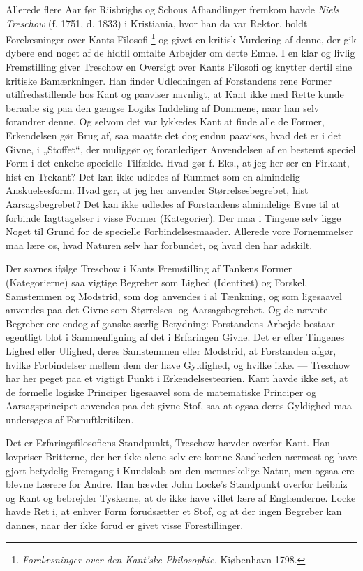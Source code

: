 \documentclass[12pt,a4paper,openany]{book}
\newcommand{\opage}[1]{\marginnote{\footnotesize\textit{[#1]}}}
\begin{document}
Allerede flere Aar før Riisbrighs og Schous Afhandlinger fremkom havde
\emph{Niels} \emph{Treschow} (f. 1751, d. 1833) i Kristiania, hvor han da var
Rektor, holdt Forelæsninger over Kants Filosofi%
\footnote[1]{\textit{Forelæsninger over den Kant'ske Philosophie.} Kiøbenhavn
1798.} og givet en kritisk Vurdering af denne, der gik dybere end noget af de
hidtil omtalte Arbejder om dette Emne. I en klar og livlig Fremstilling giver
Treschow en Oversigt over Kants Filosofi og knytter dertil sine kritiske
Bamærkninger. Han finder Udledningen af Forstandens rene Former
utilfredsstillende hos Kant og paaviser navnligt, at Kant ikke med Rette kunde
beraabe sig paa den gængse Logiks Inddeling af Dommene, naar han selv forandrer
denne. Og selvom det var lykkedes Kant at finde alle de Former, Erkendelsen gør
Brug af, saa maatte det dog endnu paavises, hvad det er i det Givne, i
„Stoffet“, der muliggør og foranlediger Anvendelsen af en bestemt speciel Form
i det enkelte specielle Tilfælde. Hvad gør f. Eks., at jeg her ser en Firkant,
hist en Trekant? Det kan ikke udledes af Rummet som en almindelig
Anskuelsesform. Hvad gør, at jeg her anvender Størrelsesbegrebet, hist
Aarsagsbegrebet? Det kan ikke udledes af Forstandens almindelige Evne til at
forbinde Iagttagelser i visse Former (Kategorier). Der maa i Tingene selv ligge
Noget til Grund for de specielle Forbindelsesmaader. Allerede vore Fornemmelser
maa lære os, hvad Naturen selv har forbundet, og hvad den har adskilt.

Der savnes ifølge Treschow i Kants Fremstilling af Tankens Former
(Kategorierne) saa vigtige Begreber som Lighed (Identitet) og Forskel,
Samstemmen og Modstrid, som dog anvendes i al Tænkning, og som ligesaavel
anvendes paa det Givne som Størrelses- og Aarsagsbegrebet. Og de nævnte
Begreber ere endog af ganske særlig Betydning: Forstandens Arbejde bestaar
egentligt blot i Sammenligning af
\setcounter{footnote}{0}%
\opage{38}det i Erfaringen Givne. Det er efter Tingenes Lighed eller Ulighed,
deres Samstemmen eller Modstrid, at Forstanden afgør, hvilke Forbindelser
mellem dem der have Gyldighed, og hvilke ikke. --- Treschow har her peget paa
et vigtigt Punkt i Erkendelsesteorien. Kant havde ikke set, at de formelle
logiske Principer ligesaavel som de matematiske Principer og Aarsagsprincipet
anvendes paa det givne Stof, saa at ogsaa deres Gyldighed maa undersøges af
Fornuftkritiken.

Det er Erfaringsfilosofiens Standpunkt, Treschow hævder overfor Kant. Han
lovpriser Britterne, der her ikke alene selv ere komne Sandheden nærmest og
have gjort betydelig Fremgang i Kundskab om den menneskelige Natur, men ogsaa
ere blevne Lærere for Andre. Han hævder John Locke's Standpunkt overfor Leibniz
og Kant og bebrejder Tyskerne, at de ikke have villet lære af Englænderne.
Locke havde Ret i, at enhver Form forudsætter et Stof, og at der ingen Begreber
kan dannes, naar der ikke forud er givet visse Forestillinger.
\end{document}
